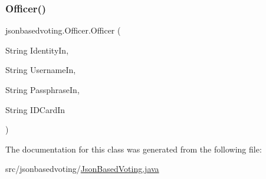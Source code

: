 \subsubsection{\texorpdfstring{Officer()}{Officer()}}
{\footnotesize\ttfamily jsonbasedvoting.\+Officer.\+Officer (\begin{DoxyParamCaption}\item[{String}]{Identity\+In,  }\item[{String}]{Username\+In,  }\item[{String}]{Passphrase\+In,  }\item[{String}]{I\+D\+Card\+In }\end{DoxyParamCaption})}



The documentation for this class was generated from the following file\+:\begin{DoxyCompactItemize}
\item 
src/jsonbasedvoting/\mbox{\hyperlink{_json_based_voting_8java}{Json\+Based\+Voting.\+java}}\end{DoxyCompactItemize}

